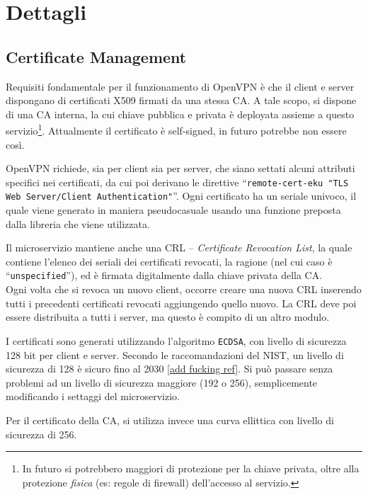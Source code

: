 \section{Dettagli}

\subsection{Certificate Management}
Requisiti fondamentale per il funzionamento di OpenVPN è che il client e server dispongano
di certificati X509 firmati da una stessa CA.
A tale scopo, si dispone di una CA interna, la cui chiave pubblica e privata è deployata
assieme a questo servizio\footnote{In futuro si potrebbero maggiori di protezione per la
	chiave privata, oltre alla protezione \textit{fisica} (es: regole di firewall) dell'accesso
al servizio.}. Attualmente il certificato è self-signed, in futuro potrebbe non essere così.

OpenVPN richiede, sia per client sia per server, che siano settati alcuni attributi
specifici nei certificati, da cui poi derivano le direttive
``\texttt{remote-cert-eku "TLS Web Server/Client
Authentication"}''. Ogni certificato ha un seriale univoco, il quale viene generato
in maniera pseudocasuale usando una funzione preposta dalla libreria che viene
utilizzata.

Il microservizio mantiene anche una CRL -- \textit{Certificate Revocation List}, la quale
contiene l'elenco dei seriali dei certificati revocati, la ragione (nel cui caso è ``\texttt{unspecified}''),
ed è firmata digitalmente dalla chiave privata della CA.\\
Ogni volta che si revoca un nuovo client, occorre creare una nuova CRL inserendo tutti i
precedenti certificati revocati aggiungendo quello nuovo. La CRL deve poi essere distribuita 
a tutti i server, ma questo è compito di un altro modulo.

I certificati sono generati utilizzando l'algoritmo \texttt{ECDSA}, con livello di sicurezza
128 bit per client e server. Secondo le raccomandazioni del NIST, un livello di sicurezza di
128 è sicuro fino al 2030 \ref{add fucking ref}. Si può passare senza
problemi ad un livello di sicurezza maggiore (192 o 256), semplicemente modificando i settaggi
del microservizio.

Per il certificato della CA, si utilizza invece una curva ellittica con livello di sicurezza
di 256.


